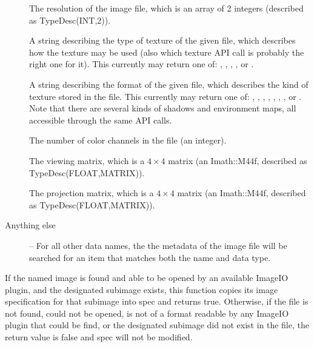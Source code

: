 \begin{description}
\item[\spc] \spc
\vspace{-12pt} \item[\rm {}] The resolution of the image file, which
is an array of 2 integers (described as {\cf TypeDesc(INT,2)}).

\item[\rm {}] A string describing the type of texture
of the given file, which describes how the texture may be used (also
which texture API call is probably the right one for it).
This currently may return one of: , ,
, , 
or .

\item[\rm {}] A string describing the format of the
given file, which describes the kind of texture stored in the file.
This currently may return one of: , ,
, , , , , or .
Note that there are several kinds of shadows and environment maps,
all accessible through the same API calls.

\item[\rm {}] The number of color channels in the file 
(an integer).

\item[\rm {}] The viewing matrix, which is a
$4 \times 4$ matrix (an {\cf Imath::M44f}, described as {\cf
  TypeDesc(FLOAT,MATRIX)}).

\item[\rm {}] The projection matrix, which is a
$4 \times 4$ matrix (an {\cf Imath::M44f}, described as {\cf
  TypeDesc(FLOAT,MATRIX)}).

\item[Anything else] -- For all other data names, the
the metadata of the image file will be searched for an item that
matches both the name and data type.

\end{description}
\apiend


If the named image is found and able to be opened by an available
ImageIO plugin, and the designated subimage exists, this function copies
its image specification for that subimage into {\cf spec} and returns
{\cf true}.  Otherwise, if the file is not found, could not be opened,
is not of a format readable by any ImageIO plugin that could be find, or
the designated subimage did not exist in the file, the return value is
{\cf false} and {\cf spec} will not be modified.

